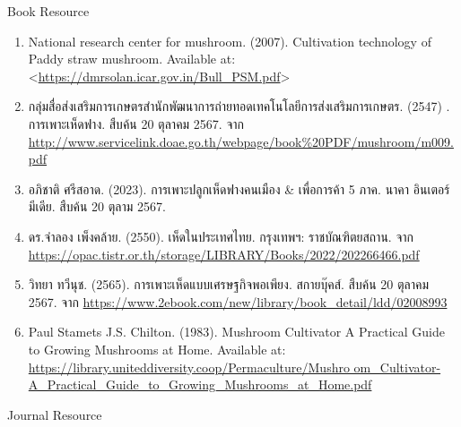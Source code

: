Book Resource
\begin{enumerate}
  \item National research center for mushroom. (2007). Cultivation technology of Paddy straw mushroom. Available at: <\href{https://dmrsolan.icar.gov.in/Bull_PSM.pdf}{https://dmrsolan.icar.gov.in/Bull\_PSM.pdf}>
  \item {\T กลุ่มสื่อส่งเสริมการเกษตรสำนักพัฒนาการถ่ายทอดเทคโนโลยีการส่งเสริมการเกษตร}. (2547) . {\T การเพาะเห็ดฟาง. สืบค้น} 20 {\T ตุลาคม} 2567. {\T จาก} \href{http://www.servicelink.doae.go.th/webpage/book%20PDF/mushroom/m009.pdf}{http://www.servicelink.doae.go.th/webpage/book\%20PDF/mushroom/m009.pdf}
  \item {\T อภิชาติ ศรีสอาด}.  (2023). {\T การเพาะปลูกเห็ดฟางคนเมือง} \& {\T เพื่อการค้า} 5 {\T ภาค}. {\T นาคา อินเตอร์มีเดีย}. {\T สืบค้น} 20 {\T ตุลาม} 2567.
  \item {\T ดร.จำลอง เพ็งคล้าย}. (2550). {\T เห็ดในประเทศไทย. กรุงเทพฯ: ราชบัณฑิตยสถาน. จาก} \href{https://opac.tistr.or.th/storage/LIBRARY/Books/2022/202266466.pdf}{https://opac.tistr.or.th/storage/LIBRARY/Books/2022/202266466.pdf}
  \item {\T วิทยา ทวีนุช}. (2565). {\T การเพาะเห็ดแบบเศรษฐกิจพอเพียง. สกายบุ๊คส์. สืบค้น} 20 {\T ตุลาคม} 2567. จาก \href{https://www.2ebook.com/new/library/book_detail/ldd/02008993}{https://www.2ebook.com/new/library/book\_detail/ldd/02008993}
  \item Paul Stamets J.S. Chilton. (1983). Mushroom Cultivator A Practical Guide to Growing Mushrooms at Home. Available at: \href{https://library.uniteddiversity.coop/Permaculture/Mushroom_Cultivator-A_Practical_Guide_to_Growing_Mushrooms_at_Home.pdf}{https://library.uniteddiversity.coop/Permaculture/Mushro om\_Cultivator-A\_Practical\_Guide\_to\_Growing\_Mushrooms\_at\_Home.pdf}
\end{enumerate}
Journal Resource

